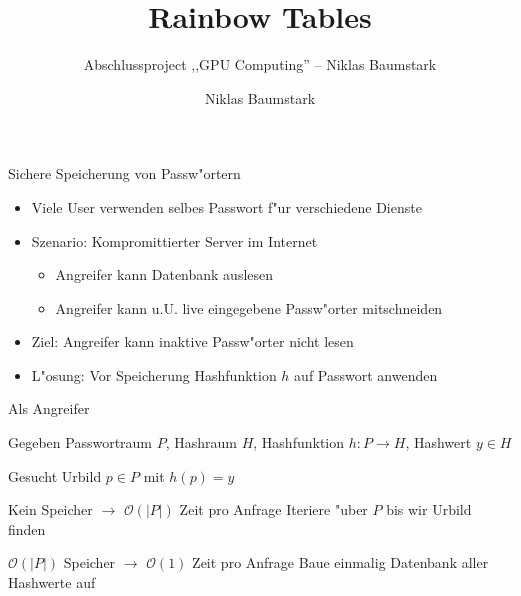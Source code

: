 \documentclass[ngerman,hyperref={pdfpagelabels=true}]{beamer}
\title{Rainbow Tables}
\subtitle{Abschlussproject ,,GPU Computing'' -- Niklas Baumstark}
\author{Niklas Baumstark}
\institute{Lehrstuhl für Computergrafik}
\begin{document}


\setlength\textheight{7cm} %

\begin{frame}
  \maketitle
\end{frame}

\newcommand\BigO{\mathcal{O}}

\begin{frame}{Sichere Speicherung von Passw"ortern}
  \begin{itemize}
  \item Viele User verwenden selbes Passwort f"ur verschiedene Dienste
  \item Szenario: Kompromittierter Server im Internet
  \begin{itemize}
  \item Angreifer kann Datenbank auslesen
  \item Angreifer kann u.U. live eingegebene Passw"orter mitschneiden
  \end{itemize}
  \item Ziel: Angreifer kann inaktive Passw"orter nicht lesen
  \item L"osung: Vor Speicherung Hashfunktion $h$ auf Passwort anwenden
  \end{itemize}
\end{frame}

\begin{frame}{Als Angreifer}
  \begin{block}{Gegeben}
  Passwortraum $P$, Hashraum $H$, Hashfunktion $h: P \rightarrow H$, Hashwert $y \in H$
  \end{block}
  \begin{block}{Gesucht}
  Urbild $p \in P$ mit $h(p) = y$
  \end{block}
  \begin{block}{Kein Speicher $\rightarrow$ $\BigO(|P|)$ Zeit pro Anfrage}
  Iteriere "uber $P$ bis wir Urbild finden
  \end{block}
  \begin{block}{$\BigO(|P|)$ Speicher $\rightarrow$ $\BigO(1)$ Zeit pro Anfrage}
  Baue einmalig Datenbank aller Hashwerte auf
  \end{block}
\end{frame}
\end{document}
